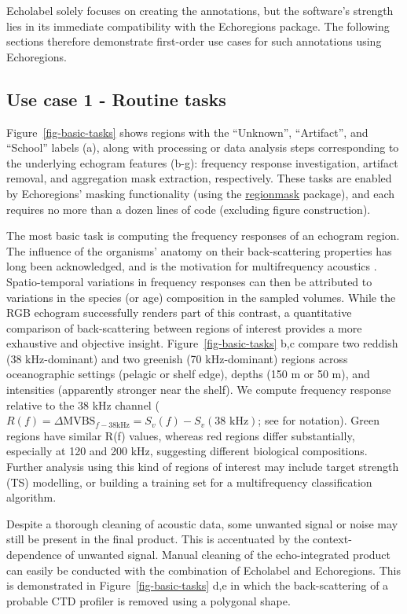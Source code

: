 \documentclass[
  number,
  preprint,
  3p]{elsarticle}
\begin{document}
Echolabel solely focuses on creating the annotations, but the software's
strength lies in its immediate compatibility with the Echoregions
package. The following sections therefore demonstrate first-order use
cases for such annotations using Echoregions.

\subsection{Use case 1 - Routine
tasks}\label{use-case-1---routine-tasks}

Figure~\ref{fig-basic-tasks} shows regions with the ``Unknown'',
``Artifact'', and ``School'' labels (a), along with processing or data
analysis steps corresponding to the underlying echogram features (b-g):
frequency response investigation, artifact removal, and aggregation mask
extraction, respectively. These tasks are enabled by Echoregions'
masking functionality (using the
\href{https://regionmask.readthedocs.io}{regionmask} package), and each
requires no more than a dozen lines of code (excluding figure
construction).

The most basic task is computing the frequency responses of an echogram
region. The influence of the organisms' anatomy on their back-scattering
properties has long been acknowledged, and is the motivation for
multifrequency acoustics \citep{benoit-bird2016}. Spatio-temporal
variations in frequency responses can then be attributed to variations
in the species (or age) composition in the sampled volumes. While the
RGB echogram successfully renders part of this contrast, a quantitative
comparison of back-scattering between regions of interest provides a
more exhaustive and objective insight. Figure~\ref{fig-basic-tasks} b,c
compare two reddish (38 kHz-dominant) and two greenish (70 kHz-dominant)
regions across oceanographic settings (pelagic or shelf edge), depths
(150 m or 50 m), and intensities (apparently stronger near the shelf).
We compute frequency response relative to the 38 kHz channel
(\(R(f) = \Delta \text{MVBS}_{f - 38 \text{kHz}} = S_{v}(f) - S_{v}(38 \text{ kHz})\);
see \citep{maclennan2002} for notation). Green regions have similar R(f)
values, whereas red regions differ substantially, especially at 120 and
200 kHz, suggesting different biological compositions. Further analysis
using this kind of regions of interest may include target strength (TS)
modelling, or building a training set for a multifrequency
classification algorithm.

Despite a thorough cleaning of acoustic data, some unwanted signal or
noise may still be present in the final product. This is accentuated by
the context-dependence of unwanted signal. Manual cleaning of the
echo-integrated product can easily be conducted with the combination of
Echolabel and Echoregions. This is demonstrated in
Figure~\ref{fig-basic-tasks} d,e in which the back-scattering of a
probable CTD profiler is removed using a polygonal shape.
\end{document}
